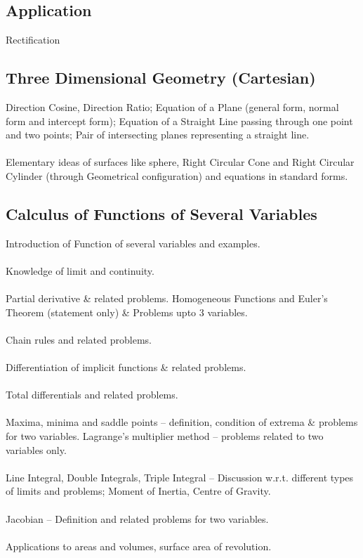 \documentclass[12pt]{article}
\begin{document}
\subsection{Application}
Rectification
\subsection{Three Dimensional Geometry (Cartesian)}
Direction Cosine, Direction Ratio; Equation of a Plane (general form, normal form and intercept form); Equation of a Straight Line passing through one point and two points; Pair of intersecting planes representing a straight line.\\ \\
Elementary ideas of surfaces like sphere, Right Circular Cone and Right Circular Cylinder (through Geometrical configuration) and equations in standard forms.
\subsection{Calculus of Functions of Several Variables}
Introduction of Function of several variables and examples.\\ \\
Knowledge of limit and continuity. \\ \\
Partial derivative \& related problems. Homogeneous Functions and Euler’s Theorem (statement only) \& Problems upto 3 variables.\\ \\
Chain rules and related problems.\\ \\
Differentiation of implicit functions \& related problems.\\ \\
Total differentials and related problems.\\ \\
Maxima, minima and saddle points – definition, condition of extrema \& problems for two variables. Lagrange’s multiplier method – problems related to two variables only.\\ \\
Line Integral, Double Integrals, Triple Integral – Discussion w.r.t. different types of limits and problems; Moment of Inertia, Centre of Gravity.\\ \\
Jacobian – Definition and related problems for two variables.\\ \\
Applications to areas and volumes, surface area of revolution.
\end{document}
